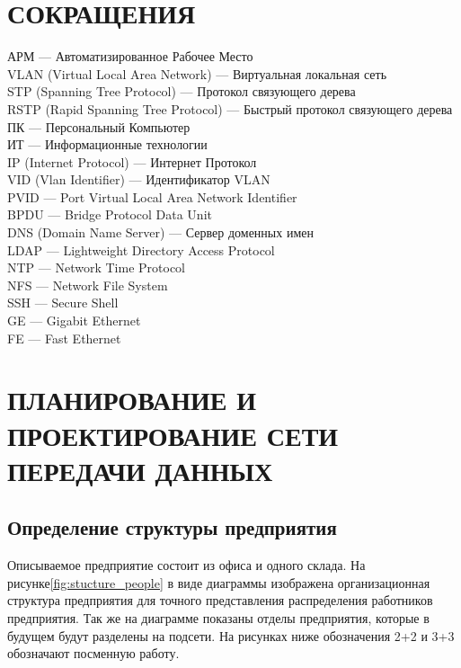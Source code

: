 \section*{СОКРАЩЕНИЯ}
\begin{raggedright}
АРМ --- Автоматизированное Рабочее Место \\
VLAN (Virtual Local Area Network) --- Виртуальная локальная сеть \\
STP (Spanning Tree Protocol) --- Протокол связующего дерева \\ 
RSTP (Rapid Spanning Tree Protocol) --- Быстрый протокол связующего дерева \\
ПК --- Персональный Компьютер \\ 
ИТ --- Информационные технологии \\ 
IP (Internet Protocol) --- Интернет Протокол \\
VID (Vlan Identifier) --- Идентификатор VLAN \\
PVID --- Port Virtual Local Area Network Identifier \\
BPDU --- Bridge Protocol Data Unit \\
DNS (Domain Name Server) --- Сервер доменных имен \\
LDAP --- Lightweight Directory Access Protocol \\
NTP --- Network Time Protocol \\
NFS --- Network File System \\
SSH --- Secure Shell \\
GE --- Gigabit Ethernet \\ 
FE --- Fast Ethernet \\ 
\end{raggedright}

\section{ПЛАНИРОВАНИЕ И ПРОЕКТИРОВАНИЕ СЕТИ ПЕРЕДАЧИ ДАННЫХ}
\subsection{Определение структуры предприятия}
Описываемое предприятие состоит из офиса и одного склада. На рисунке\;\ref{fig:stucture_people} в виде диаграммы изображена организационная структура предприятия для точного представления распределения работников предприятия. Так же на диаграмме показаны отделы предприятия, которые в будущем будут разделены на подсети. На рисунках ниже обозначения 2+2 и 3+3 обозначают посменную работу.

